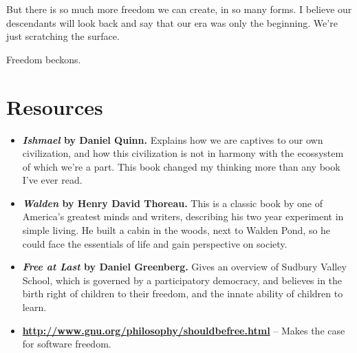 But there is so much more freedom we can create, in so many forms. I believe our descendants will look back and say that our era was only the beginning. We're just scratching the surface.

Freedom beckons.

\newpage
\section{Resources}
\begin{itemize}
\item \textbf{\emph{Ishmael} by Daniel Quinn.} Explains how we are captives to our own civilization, and how this civilization is not in harmony with the ecossystem of which we're a part. This book changed my thinking more than any book I've ever read.

\item \textbf{\emph{Walden} by Henry David Thoreau.} This is a classic book by one of America's greatest minds and writers, describing his two year experiment in simple living. He built a cabin in the woods, next to Walden Pond, so he could face the essentials of life and gain perspective on society.

\item \textbf{\emph{Free at Last} by Daniel Greenberg.} Gives an overview of Sudbury Valley School, which is governed by a participatory democracy, and believes in the birth right of children to their freedom, and the innate ability of children to learn.

\item \textbf{\url{http://www.gnu.org/philosophy/shouldbefree.html}} -- Makes the case for software freedom.
\end{itemize}
